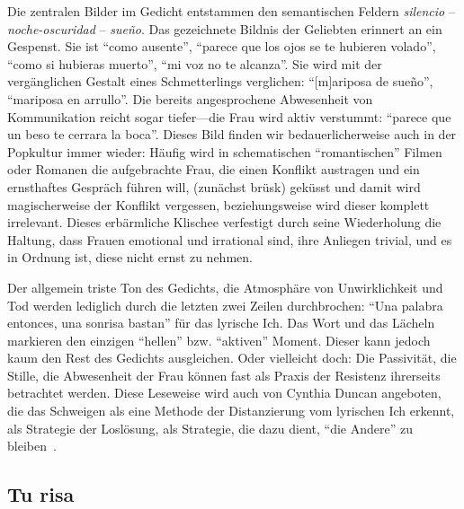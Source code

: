 Die zentralen Bilder im Gedicht entstammen den semantischen Feldern \textit{silencio} -- \textit{noche-oscuridad} -- \textit{sueño}.
Das gezeichnete Bildnis der Geliebten erinnert an ein Gespenst.
Sie ist ``como ausente'', ``parece que los ojos se te hubieren volado'', ``como si hubieras muerto'', ``mi voz no te alcanza''.
Sie wird mit der vergänglichen Gestalt eines Schmetterlings verglichen: ``[m]ariposa de sueño'', ``mariposa en arrullo''.
Die bereits angesprochene Abwesenheit von Kommunikation reicht sogar tiefer—die Frau wird aktiv verstummt: ``parece que un beso te cerrara la boca''.
Dieses Bild finden wir bedauerlicherweise auch in der Popkultur immer wieder:
Häufig wird in schematischen ``romantischen'' Filmen oder Romanen die aufgebrachte Frau, die einen Konflikt austragen und ein ernsthaftes Gespräch führen will, (zunächst brüsk) geküsst und damit wird magischerweise der Konflikt vergessen, beziehungsweise wird dieser komplett irrelevant.
Dieses erbärmliche Klischee verfestigt durch seine Wiederholung die Haltung, dass Frauen emotional und irrational sind, ihre Anliegen trivial, und es in Ordnung ist, diese nicht ernst zu nehmen.

Der allgemein triste Ton des Gedichts, die Atmosphäre von Unwirklichkeit und Tod werden lediglich durch die letzten zwei Zeilen durchbrochen: ``Una palabra entonces, una sonrisa bastan'' für das lyrische Ich.
Das Wort und das Lächeln markieren den einzigen ``hellen'' bzw. ``aktiven'' Moment.
Dieser kann jedoch kaum den Rest des Gedichts ausgleichen.
Oder vielleicht doch: Die Passivität, die Stille, die Abwesenheit der Frau können fast als Praxis der Resistenz ihrerseits betrachtet werden.
Diese Leseweise wird auch von Cynthia Duncan angeboten, die das Schweigen als eine Methode der Distanzierung vom lyrischen Ich erkennt, als Strategie der Loslösung, als Strategie, die dazu dient, ``die Andere'' zu bleiben~\cite{Duncan1992}.

\begin{comment}
  * 4 x 4Line verse: Quartette (lookup wie das korrekt heißt auf Deutsch!) + 2 x 2Zeiler (Couplets) --> erinnert ein bisschen an Sonnetform aber nicht ganz (Wie heißen nochma die verschiedene Sonnetformen? Nicht die von Gongora sondern die von Shakespeare meine ich grad: 3x4Zeilen und dann 2)
\end{comment}

\subsection{Tu risa}

